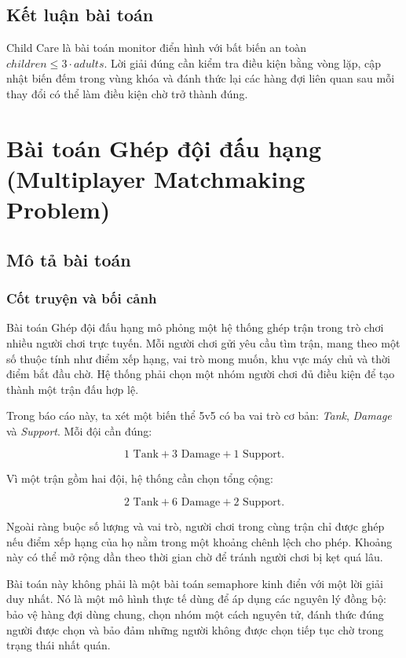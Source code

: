 \subsection{Kết luận bài toán}

Child Care là bài toán monitor điển hình với bất biến an toàn $children \le 3 \cdot adults$. Lời giải đúng cần kiểm tra điều kiện bằng vòng lặp, cập nhật biến đếm trong vùng khóa và đánh thức lại các hàng đợi liên quan sau mỗi thay đổi có thể làm điều kiện chờ trở thành đúng.

\section{Bài toán Ghép đội đấu hạng (Multiplayer Matchmaking Problem)}

\subsection{Mô tả bài toán}

\subsubsection*{Cốt truyện và bối cảnh}

Bài toán Ghép đội đấu hạng mô phỏng một hệ thống ghép trận trong trò chơi
nhiều người chơi trực tuyến. Mỗi người chơi gửi yêu cầu tìm trận, mang theo
một số thuộc tính như điểm xếp hạng, vai trò mong muốn, khu vực máy chủ và thời
điểm bắt đầu chờ. Hệ thống phải chọn một nhóm người chơi đủ điều kiện để tạo
thành một trận đấu hợp lệ.

Trong báo cáo này, ta xét một biến thể 5v5 có ba vai trò cơ bản:
\textit{Tank}, \textit{Damage} và \textit{Support}. Mỗi đội cần đúng:

\[
    1 \text{ Tank} + 3 \text{ Damage} + 1 \text{ Support}.
\]

Vì một trận gồm hai đội, hệ thống cần chọn tổng cộng:

\[
    2 \text{ Tank} + 6 \text{ Damage} + 2 \text{ Support}.
\]

Ngoài ràng buộc số lượng và vai trò, người chơi trong cùng trận chỉ được ghép
nếu điểm xếp hạng của họ nằm trong một khoảng chênh lệch cho phép. Khoảng này
có thể mở rộng dần theo thời gian chờ để tránh người chơi bị kẹt quá lâu.

Bài toán này không phải là một bài toán semaphore kinh điển với một lời giải
duy nhất. Nó là một mô hình thực tế dùng để áp dụng các nguyên lý đồng bộ:
bảo vệ hàng đợi dùng chung, chọn nhóm một cách nguyên tử, đánh thức đúng người
được chọn và bảo đảm những người không được chọn tiếp tục chờ trong trạng thái
nhất quán.

